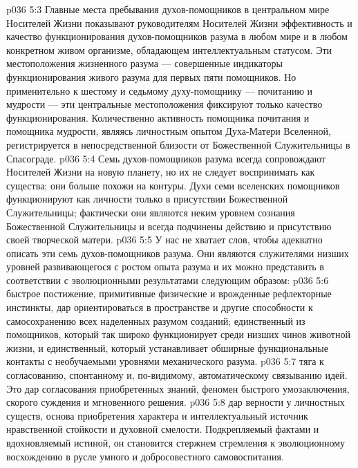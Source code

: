 \vs p036 5:3 Главные места пребывания духов\hyp{}помощников в центральном мире Носителей Жизни показывают руководителям Носителей Жизни эффективность и качество функционирования духов\hyp{}помощников разума в любом мире и в любом конкретном живом организме, обладающем интеллектуальным статусом. Эти местоположения жизненного разума --- совершенные индикаторы функционирования живого разума для первых пяти помощников. Но применительно к шестому и седьмому духу\hyp{}помощнику --- почитанию и мудрости --- эти центральные местоположения фиксируют только качество функционирования. Количественно активность помощника почитания и помощника мудрости, являясь личностным опытом Духа\hyp{}Матери Вселенной, регистрируется в непосредственной близости от Божественной Служительницы в Спасограде.
\vs p036 5:4 \pc Семь духов\hyp{}помощников разума всегда сопровождают Носителей Жизни на новую планету, но их не следует воспринимать как существа; они больше похожи на контуры. Духи семи вселенских помощников функционируют как личности только в присутствии Божественной Служительницы; фактически они являются неким уровнем сознания Божественной Служительницы и всегда подчинены действию и присутствию своей творческой матери.
\vs p036 5:5 У нас не хватает слов, чтобы адекватно описать эти семь духов\hyp{}помощников разума. Они являются служителями низших уровней развивающегося с ростом опыта разума и их можно представить в соответствии с эволюционными результатами следующим образом:
\vs p036 5:6 \pc {}\bibnobreakspace {} быстрое постижение, примитивные физические и врожденные рефлекторные инстинкты, дар ориентироваться в пространстве и другие способности к самосохранению всех наделенных разумом созданий; единственный из помощников, который так широко функционирует среди низших чинов животной жизни, и единственный, который устанавливает обширные функциональные контакты с необучаемыми уровнями механического разума.
\vs p036 5:7 \pc {}\bibnobreakspace {} тяга к согласованию, спонтанному и, по\hyp{}видимому, автоматическому связыванию идей. Это дар согласования приобретенных знаний, феномен быстрого умозаключения, скорого суждения и мгновенного решения.
\vs p036 5:8 \pc {}\bibnobreakspace {} дар верности у личностных существ, основа приобретения характера и интеллектуальный источник нравственной стойкости и духовной смелости. Подкрепляемый фактами и вдохновляемый истиной, он становится стержнем стремления к эволюционному восхождению в русле умного и добросовестного самовоспитания.
